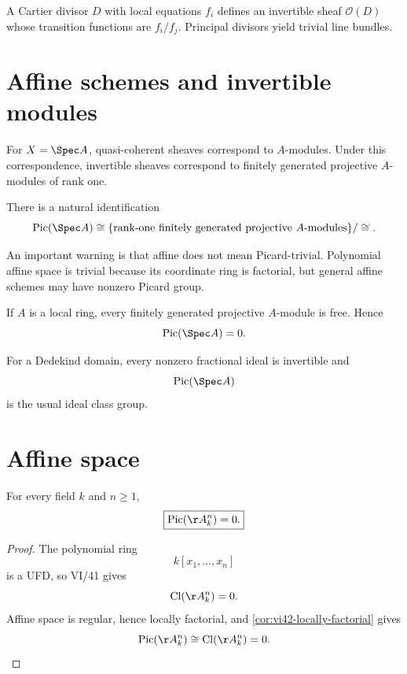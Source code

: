 \begin{example}\label{ex:vi42-expand-02}
A Cartier divisor $D$ with local equations $f_i$ defines an invertible sheaf $\mathcal O(D)$ whose transition functions are $f_i/f_j$.  Principal divisors yield trivial line bundles.
\end{example}
\section{Affine schemes and invertible modules}

For \(X=\Spec A\), quasi-coherent sheaves correspond to \(A\)-modules.  Under this correspondence, invertible sheaves correspond to finitely generated projective \(A\)-modules of rank one.

\begin{proposition}\label{prop:vi42-affine-pic}
There is a natural identification
\[
  \Pic(\Spec A)
  \cong
  \{\text{rank-one finitely generated projective }A\text{-modules}\}/\cong.
\]
\end{proposition}

An important warning is that affine does not mean Picard-trivial.  Polynomial affine space is trivial because its coordinate ring is factorial, but general affine schemes may have nonzero Picard group.

If \(A\) is a local ring, every finitely generated projective \(A\)-module is free.  Hence
\[
  \Pic(\Spec A)=0.
\]

For a Dedekind domain, every nonzero fractional ideal is invertible and
\[
  \Pic(\Spec A)
\]
is the usual ideal class group.

\section{Affine space}

\begin{theorem}\label{thm:vi42-affine-space}
For every field \(k\) and \(n\ge1\),
\[
  \boxed{\Pic(\AA^n_k)=0.}
\]
\end{theorem}

\begin{proof}
The polynomial ring
\[
  k[x_1,\ldots,x_n]
\]
is a UFD, so VI/41 gives
\[
  \Cl(\AA^n_k)=0.
\]
Affine space is regular, hence locally factorial, and \cref{cor:vi42-locally-factorial} gives
\[
  \Pic(\AA^n_k)\cong\Cl(\AA^n_k)=0.
\]
\end{proof}

